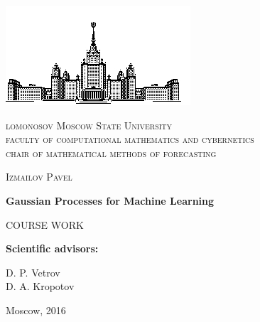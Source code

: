 \begin{titlepage}
  \centering
  \includegraphics{pictures/msu.jpg}\par\vspace{1cm}
  {\scshape lomonosov Moscow State University\\ faculty of computational mathematics and cybernetics\\ chair of mathematical methods of forecasting \par}
  \vspace{2cm}
  {\scshape\large Izmailov Pavel\par}
  \vspace{1cm}
  {\LARGE\bfseries Gaussian Processes for Machine Learning\par}
  \vspace{1.5cm}
  {\scshape COURSE WORK\par}
  \vfill

  \raggedleft
  
  {\bf Scientific advisors:}\par
  D. P. Vetrov\\
  D. A. Kropotov
  
  \vfill
  {\center\large Moscow, 2016\par}
\end{titlepage}
